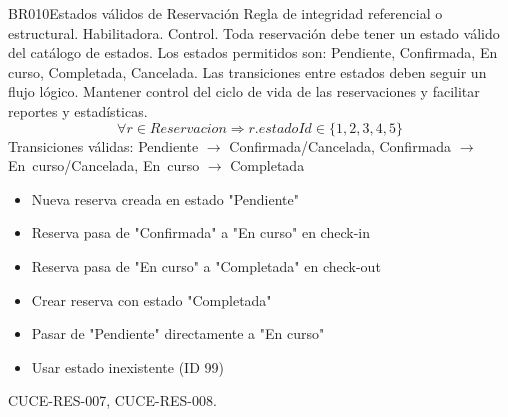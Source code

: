 \begin{BussinesRule}{BR010}{Estados válidos de Reservación}
	\BRitem[Tipo:] Regla de integridad referencial o estructural.
	\BRitem[Clase:] Habilitadora.
	\BRitem[Nivel:] Control.
	\BRitem[Descripción:] Toda reservación debe tener un estado válido del catálogo de estados. Los estados permitidos son: Pendiente, Confirmada, En curso, Completada, Cancelada. Las transiciones entre estados deben seguir un flujo lógico.
	\BRitem[Motivación:] Mantener control del ciclo de vida de las reservaciones y facilitar reportes y estadísticas.
	\BRitem[Sentencia:] 
		\begin{displaymath}
			\forall r \in Reservacion \Rightarrow r.estadoId \in \{1, 2, 3, 4, 5\}
		\end{displaymath}
		Transiciones válidas: Pendiente $\rightarrow$ Confirmada/Cancelada, Confirmada $\rightarrow$ En~curso/Cancelada, En~curso $\rightarrow$ Completada
		\begin{itemize}
			\item Nueva reserva creada en estado "Pendiente"
			\item Reserva pasa de "Confirmada" a "En curso" en check-in
			\item Reserva pasa de "En curso" a "Completada" en check-out
		\end{itemize}
		\begin{itemize}
			\item Crear reserva con estado "Completada"
			\item Pasar de "Pendiente" directamente a "En curso"
			\item Usar estado inexistente (ID 99)
		\end{itemize}
	 CUCE-RES-007, CUCE-RES-008.
\end{BussinesRule}
